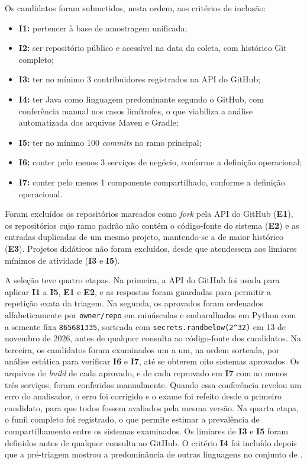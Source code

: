 Os candidatos foram submetidos, nesta ordem, aos critérios de inclusão:
\begin{itemize}
    \item \textbf{I1:} pertencer à base de amostragem unificada;
    \item \textbf{I2:} ser repositório público e acessível na data da coleta, com histórico Git completo;
    \item \textbf{I3:} ter no mínimo 3 contribuidores registrados na API do GitHub;
    \item \textbf{I4:} ter Java como linguagem predominante segundo o GitHub, com conferência manual nos casos limítrofes, o que viabiliza a análise automatizada dos arquivos Maven e Gradle;
    \item \textbf{I5:} ter no mínimo 100 \textit{commits} no ramo principal;
    \item \textbf{I6:} conter pelo menos 3 serviços de negócio, conforme a definição operacional;
    \item \textbf{I7:} conter pelo menos 1 componente compartilhado, conforme a definição operacional.
\end{itemize}

Foram excluídos os repositórios marcados como \textit{fork} pela API do GitHub (\textbf{E1}), os repositórios cujo ramo padrão não contém o código-fonte do sistema (\textbf{E2}) e as entradas duplicadas de um mesmo projeto, mantendo-se a de maior histórico (\textbf{E3}). Projetos didáticos não foram excluídos, desde que atendessem aos limiares mínimos de atividade (\textbf{I3} e \textbf{I5}).

A seleção teve quatro etapas. Na primeira, a API do GitHub foi usada para aplicar \textbf{I1} a \textbf{I5}, \textbf{E1} e \textbf{E2}, e as respostas foram guardadas para permitir a repetição exata da triagem. Na segunda, os aprovados foram ordenados alfabeticamente por \texttt{owner/repo} em minúsculas e embaralhados em Python com a semente fixa \texttt{865681335}, sorteada com \texttt{secrets.randbelow(2\^{}32)} em 13 de novembro de 2026, antes de qualquer consulta ao código-fonte dos candidatos. Na terceira, os candidatos foram examinados um a um, na ordem sorteada, por análise estática para verificar \textbf{I6} e \textbf{I7}, até se obterem oito sistemas aprovados. Os arquivos de \textit{build} de cada aprovado, e de cada reprovado em \textbf{I7} com ao menos três serviços, foram conferidos manualmente. Quando essa conferência revelou um erro do analisador, o erro foi corrigido e o exame foi refeito desde o primeiro candidato, para que todos fossem avaliados pela mesma versão. Na quarta etapa, o funil completo foi registrado, o que permite estimar a prevalência de compartilhamento entre os sistemas examinados. Os limiares de \textbf{I3} e \textbf{I5} foram definidos antes de qualquer consulta ao GitHub. O critério \textbf{I4} foi incluído depois que a pré-triagem mostrou a predominância de outras linguagens no conjunto de .

